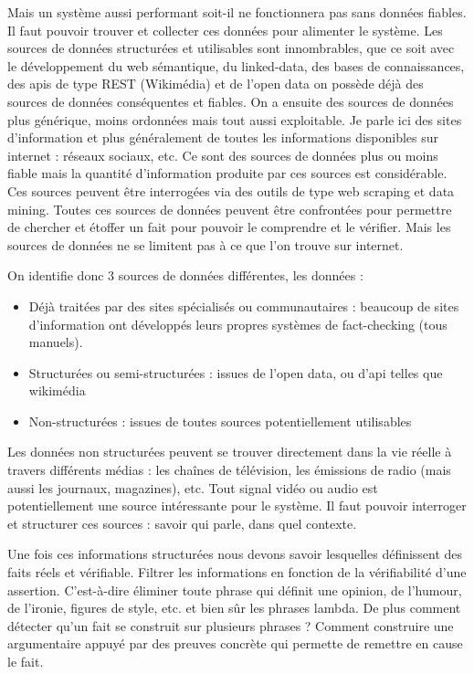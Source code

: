 Mais un système aussi performant soit-il ne fonctionnera pas sans données fiables. Il faut pouvoir trouver et collecter ces données pour alimenter le système. Les sources de données structurées et utilisables sont innombrables, que ce soit avec le développement du web sémantique, du linked-data, des bases de connaissances, des apis de type REST (Wikimédia) et de l'open data on possède déjà des sources de données conséquentes et fiables. On a ensuite des sources de données plus générique, moins ordonnées mais tout aussi exploitable. Je parle ici des sites d'information et plus généralement de toutes les informations disponibles sur internet : réseaux sociaux, etc. Ce sont des sources de données plus ou moins fiable mais la quantité d'information produite par ces sources est considérable. Ces sources peuvent être interrogées via des outils de type web scraping et data mining.
Toutes ces sources de données peuvent être confrontées pour permettre de chercher et étoffer un fait pour pouvoir le comprendre et le vérifier.
Mais les sources de données ne se limitent pas à ce que l'on trouve sur internet.

On identifie donc 3 sources de données différentes, les données : 

\begin{itemize}
    \item Déjà traitées par des sites spécialisés ou communautaires : beaucoup de sites d'information ont développés leurs propres systèmes de fact-checking (tous manuels). 
    \item Structurées ou semi-structurées : issues de l'open data, ou d'api telles que wikimédia
    \item Non-structurées : issues de toutes sources potentiellement utilisables
\end{itemize}

Les données non structurées peuvent se trouver directement dans la vie réelle à travers différents médias : les chaînes de télévision, les émissions de radio (mais aussi les journaux, magazines), etc. Tout signal vidéo ou audio est potentiellement une source intéressante pour le système. Il faut pouvoir interroger et structurer ces sources : savoir qui parle, dans quel contexte.

Une fois ces informations structurées nous devons savoir lesquelles définissent des faits réels et vérifiable. Filtrer les informations en fonction de la vérifiabilité d'une assertion. C'est-à-dire éliminer toute phrase qui définit une opinion, de l'humour, de l'ironie, figures de style, etc. et bien sûr les phrases lambda. De plus comment détecter qu'un fait se construit sur plusieurs phrases ? Comment construire une argumentaire appuyé par des preuves concrète qui permette de remettre en cause le fait.

